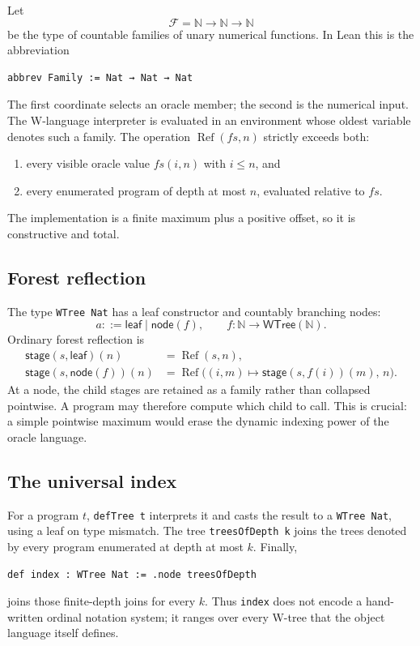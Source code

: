 \documentclass[11pt]{article}
\theoremstyle{definition}
\theoremstyle{remark}
\newcommand{\N}{\mathbb{N}}
\newcommand{\Fam}{\mathcal{F}}
\newcommand{\Refl}{\operatorname{Ref}}
\newcommand{\lean}[1]{\texttt{#1}}
\begin{document}
Let
\[
  \Fam = \N\to\N\to\N
\]
be the type of countable families of unary numerical functions.  In Lean this
is the abbreviation
\begin{lstlisting}
abbrev Family := Nat → Nat → Nat
\end{lstlisting}
The first coordinate selects an oracle member; the second is the numerical
input.  The W-language interpreter is evaluated in an environment whose oldest
variable denotes such a family.  The operation
\(
  \Refl(fs,n)
\)
strictly exceeds both:
\begin{enumerate}[leftmargin=*]
  \item every visible oracle value \(fs(i,n)\) with \(i\le n\), and
  \item every enumerated program of depth at most \(n\), evaluated relative to
        \(fs\).
\end{enumerate}
The implementation is a finite maximum plus a positive offset, so it is
constructive and total.

\subsection{Forest reflection}

The type \lean{WTree Nat} has a leaf constructor and countably branching nodes:
\[
  a ::= \mathsf{leaf}\mid \mathsf{node}(f),\qquad
  f:\N\to \mathsf{WTree}(\N).
\]
Ordinary forest reflection is
\[
\begin{aligned}
  \mathsf{stage}(s,\mathsf{leaf})(n)
    &= \Refl(s,n),\\
  \mathsf{stage}(s,\mathsf{node}(f))(n)
    &= \Refl\bigl((i,m)\mapsto
        \mathsf{stage}(s,f(i))(m),\,n\bigr).
\end{aligned}
\]
At a node, the child stages are retained as a family rather than collapsed
pointwise.  A program may therefore compute which child to call.  This is
crucial: a simple pointwise maximum would erase the dynamic indexing power of
the oracle language.

\subsection{The universal index}

For a program \(t\), \lean{defTree t} interprets it and casts the result to a
\lean{WTree Nat}, using a leaf on type mismatch.  The tree
\lean{treesOfDepth k} joins the trees denoted by every program enumerated at
depth at most \(k\).  Finally,
\begin{lstlisting}
def index : WTree Nat := .node treesOfDepth
\end{lstlisting}
joins those finite-depth joins for every \(k\).  Thus \lean{index} does not
encode a hand-written ordinal notation system; it ranges over every W-tree
that the object language itself defines.
\end{document}
